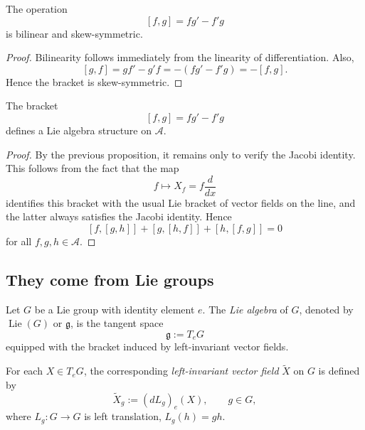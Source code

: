 \documentclass[11pt, a4paper]{report}
\begin{document}
        \begin{proposition}
        The operation
        \[
        [f,g]=fg'-f'g
        \]
        is bilinear and skew-symmetric.
        \end{proposition}
        
        \begin{proof}
        Bilinearity follows immediately from the linearity of differentiation. Also,
        \[
        [g,f]=gf'-g'f=-(fg'-f'g)=-[f,g].
        \]
        Hence the bracket is skew-symmetric.
        \end{proof}
        
        \begin{theorem}
        The bracket
        \[
        [f,g]=fg'-f'g
        \]
        defines a Lie algebra structure on $\mathcal{A}$.
        \end{theorem}
        
        \begin{proof}
        By the previous proposition, it remains only to verify the Jacobi identity. This follows from the fact that the map
        \[
        f\longmapsto X_f=f\frac{d}{dx}
        \]
        identifies this bracket with the usual Lie bracket of vector fields on the line, and the latter always satisfies the Jacobi identity. Hence
        \[
        [f,[g,h]]+[g,[h,f]]+[h,[f,g]]=0
        \]
        for all $f,g,h\in \mathcal{A}$.
 \end{proof}

\subsection{They come from Lie groups}

\begin{definition}
    Let \(G\) be a Lie group with identity element \(e\). The \emph{Lie algebra} of \(G\), denoted by \(\operatorname{Lie}(G)\) or \(\mathfrak g\), is the tangent space
    \[
    \mathfrak g:=T_eG
    \]
    equipped with the bracket induced by left-invariant vector fields.
    \end{definition}
    
    \begin{definition}
    For each \(X\in T_eG\), the corresponding \emph{left-invariant vector field} \(\widetilde X\) on \(G\) is defined by
    \[
    \widetilde X_g:=(dL_g)_e(X),
    \qquad g\in G,
    \]
    where \(L_g:G\to G\) is left translation, \(L_g(h)=gh\).
    \end{definition}
    
\end{document}
